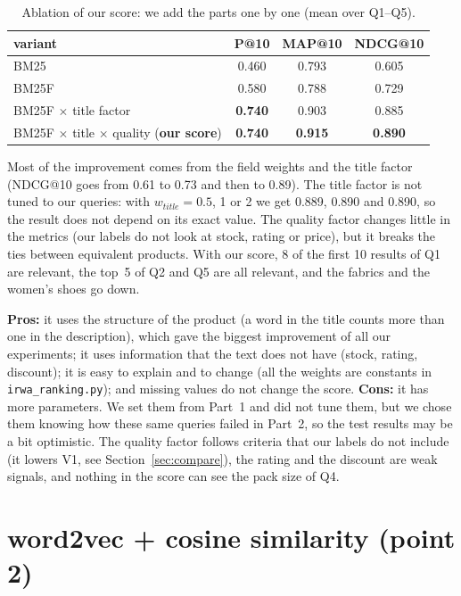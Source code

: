 \documentclass[11pt,a4paper]{article}
\newcommand{\best}[1]{\textbf{#1}}
\begin{document}
\begin{table}[H]
\centering\small
\caption{Ablation of our score: we add the parts one by one (mean over Q1--Q5).}
\label{tab:ablation}
\begin{tabular}{@{}lccc@{}}
\toprule
variant & P@10 & MAP@10 & NDCG@10\\
\midrule
BM25 & 0.460 & 0.793 & 0.605\\
BM25F & 0.580 & 0.788 & 0.729\\
BM25F $\times$ title factor & \best{0.740} & 0.903 & 0.885\\
BM25F $\times$ title $\times$ quality (\textbf{our score}) & \best{0.740} & \best{0.915} & \best{0.890}\\
\bottomrule
\end{tabular}
\end{table}

Most of the improvement comes from the field weights and the title factor (NDCG@10 goes from 0.61 to 0.73 and then to
0.89). The title factor is not tuned to our queries: with $w_{title} = 0.5$, 1 or 2 we get 0.889, 0.890 and 0.890, so
the result does not depend on its exact value. The quality
factor changes little in the metrics (our labels do not look at stock, rating or price), but it breaks the ties between
equivalent products. With our score, 8 of the first 10 results of Q1 are relevant, the top~5 of Q2 and Q5 are all
relevant, and the fabrics and the women's shoes go down.

\textbf{Pros:} it uses the structure of the product (a word in the title counts more than one in the description),
which gave the biggest improvement of all our experiments; it uses information that the text does not have (stock,
rating, discount); it is easy to explain and to change (all the weights are constants in \texttt{irwa\_ranking.py});
and missing values do not change the score. \textbf{Cons:} it has more parameters. We set them from Part~1 and did not
tune them, but we chose them knowing how these same queries failed in Part~2, so the test results may be a bit
optimistic. The quality factor follows criteria that our labels do not include (it lowers V1, see
Section~\ref{sec:compare}), the rating and the discount are weak signals, and nothing in the score can see the pack size
of Q4.

\section{word2vec + cosine similarity (point 2)}
\end{document}
